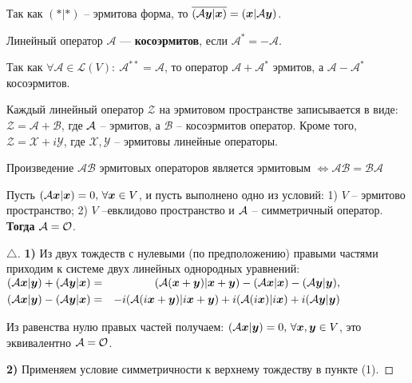 Так как $(*|*)$ -- эрмитова форма, то $\overline{(\mathcal{A} \mbox{\boldmath $y$}|\mbox{\boldmath $x$})} = (\mbox{\boldmath $x$}|\mathcal{A} \mbox{\boldmath $y$})$.

\begin{to_def} 
	Линейный оператор $\mathcal{A}$ --- \textbf{косоэрмитов}, если $\mathcal A^* = -\mathcal A$.
\end{to_def}

Так как $\forall \mathcal{A}\in \mathcal{L}(V):\: \mathcal A^{* *} = \mathcal{A}$, то оператор $\mathcal{A} + \mathcal{A}^*$ эрмитов, а $\mathcal{A} - \mathcal{A}^*$ косоэрмитов. 

\begin{to_thr} 
	Каждый линейный оператор $\mathcal{Z}$ на эрмитовом пространстве записывается в виде: $\mathcal{Z} = \mathcal{A} + \mathcal{B}$, где  $\mathcal A$ -- эрмитов, а $\mathcal{B}$ -- косоэрмитов оператор. 
	Кроме того, $\mathcal{Z} = \mathcal{X} + i \mathcal{Y}$, где $\mathcal{X}, \mathcal{Y}$ -- эрмитовы линейные операторы.
\end{to_thr}

\begin{to_thr} 
	Произведение $\mathcal{A B}$ эрмитовых операторов является эрмитовым $\Longleftrightarrow \mathcal{A B} = \mathcal{B A}$ 
\end{to_thr}

\begin{to_thr} 
	 Пусть $(\mathcal A \mbox{\boldmath $x$}|\mbox{\boldmath $x$}) = 0, \, \forall \mbox{\boldmath $x$} \in V$, и пусть выполнено одно из условий: 1) $V$ -- эрмитово пространство; 2) $V$ --евклидово пространство и $\mathcal A$ -- симметричный оператор.
	 \textbf{Тогда} $\mathcal A = \mathcal{O}$.
\end{to_thr}

\begin{proof}[$\triangle$]
	\textbf{1)} Из двух тождеств с нулевыми (по предположению) правыми частями приходим к системе двух линейных однородных уравнений:
	 $\begin{aligned}
	 	&(\mathcal A \mbox{\boldmath $x$} | \mbox{\boldmath $y$}) + (\mathcal A \mbox{\boldmath $y$}|\mbox{\boldmath $x$}) = &(\mathcal A (\mbox{\boldmath $x$} + \mbox{\boldmath $y$}) | \mbox{\boldmath $x$} + \mbox{\boldmath $y$}) - (\mathcal A \mbox{\boldmath $x$}|\mbox{\boldmath $x$}) - (\mathcal A \mbox{\boldmath $y$}|\mbox{\boldmath $y$}),\\
	 	&(\mathcal A \mbox{\boldmath $x$} | \mbox{\boldmath $y$}) - (\mathcal A \mbox{\boldmath $y$}|\mbox{\boldmath $x$}) = &- i(\mathcal A (i\mbox{\boldmath $x$} + \mbox{\boldmath $y$}) | i\mbox{\boldmath $x$} + \mbox{\boldmath $y$}) + i(\mathcal A (i\mbox{\boldmath $x$})|i \mbox{\boldmath $x$}) + i(\mathcal A \mbox{\boldmath $y$}|\mbox{\boldmath $y$})
	 \end{aligned}$

	 Из равенства нулю правых частей получаем: $(\mathcal A \mbox{\boldmath $x$}|\mbox{\boldmath $y$})= 0, \, \forall \mbox{\boldmath $x$}, \mbox{\boldmath $y$} \in V$, это эквивалентно $\mathcal A = \mathcal O$.

	 \textbf{2)} Применяем условие симметричности к верхнему тождеству в пункте (1).
\end{proof}


